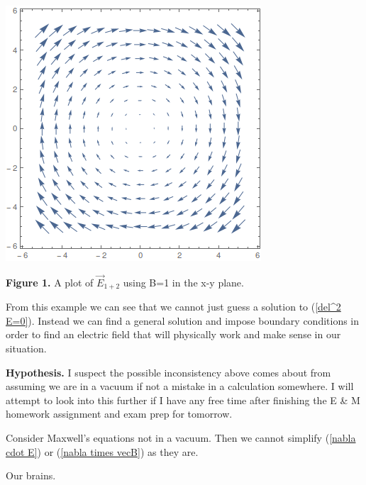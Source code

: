 \documentclass[11pt]{article}
\begin{document}
\begin{center}
	\includegraphics[]{E1plus2.png}
	
	{\footnotesize \textbf{Figure 1.} A plot of $\vec{E}_{1+2}$ using B=1 in the x-y plane.}
\end{center}

From this example we can see that we cannot just guess a solution to (\ref{del^2 E=0}). Instead we can find a general solution and impose boundary conditions in order to find an electric field that will physically work and make sense in our situation.

\begin{center}
	\textbf{Hypothesis.} I suspect the possible inconsistency above comes about from assuming we are in a vacuum if not a mistake in a calculation somewhere. I will attempt to look into this further if I have any free time after finishing the E \& M homework assignment and exam prep for tomorrow.
\end{center}

Consider Maxwell's equations not in a vacuum. Then we cannot simplify (\ref{nabla cdot E}) or (\ref{nabla times vecB}) as they are. 



\begin{thebibliography}{9}
	 Our brains.
\end{thebibliography}

\end{document}
